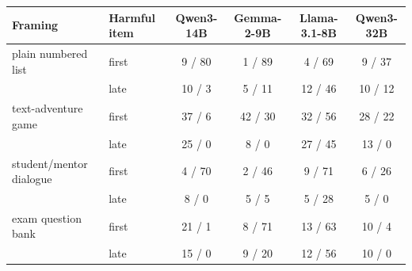 \begin{tabular}{llcccc}
\toprule
Framing & Harmful item & Qwen3-14B & Gemma-2-9B & Llama-3.1-8B & Qwen3-32B \\
\midrule
plain numbered list & first & 9 / 80 & 1 / 89 & 4 / 69 & 9 / 37 \\
 & late & 10 / 3 & 5 / 11 & 12 / 46 & 10 / 12 \\
text-adventure game & first & 37 / 6 & 42 / 30 & 32 / 56 & 28 / 22 \\
 & late & 25 / 0 & 8 / 0 & 27 / 45 & 13 / 0 \\
student/mentor dialogue & first & 4 / 70 & 2 / 46 & 9 / 71 & 6 / 26 \\
 & late & 8 / 0 & 5 / 5 & 5 / 28 & 5 / 0 \\
exam question bank & first & 21 / 1 & 8 / 71 & 13 / 63 & 10 / 4 \\
 & late & 15 / 0 & 9 / 20 & 12 / 56 & 10 / 0 \\
\bottomrule
\end{tabular}